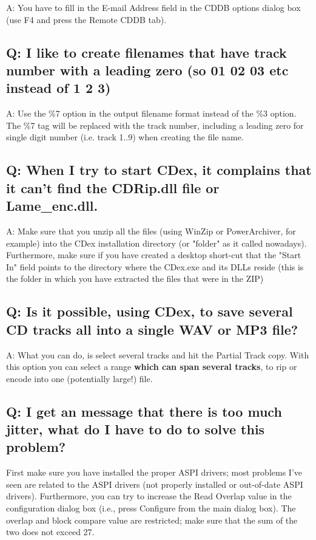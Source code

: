 A: You have to fill in the E-mail Address field in the CDDB 
options dialog box (use F4 and press the Remote CDDB tab).


\subsection{Q: I like to create filenames that have track number 
with a leading zero (so 01 02 03 etc instead of 1 2 3) }

A: Use the \%7 option in the output filename format instead of the 
\%3 option. The \%7 tag will be replaced with the track number, including 
a leading zero for single digit number (i.e. track 1..9) when 
creating the file name.


\subsection{Q: When I try to start CDex, it complains that it can't 
find the CDRip.dll file or Lame_enc.dll.}

A: Make sure that you unzip all the files (using WinZip 
or PowerArchiver, for example) into the CDex installation directory (or "folder" as 
it called nowadays).  Furthermore, make sure if you have created a 
desktop short-cut that the "Start In" field points to the directory 
where the CDex.exe and its DLLs reside (this is the folder in 
which you have extracted the files that were in the ZIP)

\subsection{Q: Is it possible, using CDex, to save several CD tracks all into a single
WAV or MP3 file?}

A: What you can do, is select several tracks and hit the Partial Track
copy.  With this option you can select a range {\bf which can span several tracks},
to rip or encode into one (potentially large!) file.


\subsection{Q: I get an message that there is too much jitter, what do I have 
to do to solve this problem?}

First make sure you have installed the proper ASPI drivers; most problems
I've seen are related to the ASPI drivers (not properly installed or out-of-date ASPI drivers).
Furthermore, you can try to increase the Read Overlap value in the configuration dialog
box (i.e., press Configure from the main dialog box). The overlap and 
block compare value are restricted; make sure that the sum of the two does not 
exceed 27.

